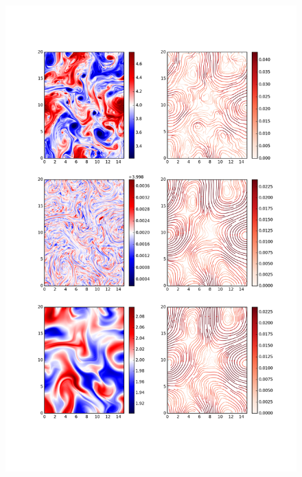 \documentclass[12pt,a4paper]{report}
\begin{document}
  \begin{figure}
  	\centering
  	\includegraphics[width=0.8\linewidth]{notoppv}
  	\caption{}
  	\label{fig:notoppv}
  \end{figure}
  
\end{document}
